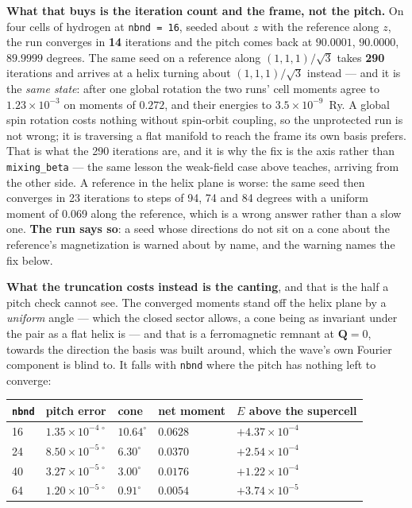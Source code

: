 \documentclass[11pt,a4paper]{article}
\newcommand{\code}[1]{\texttt{\small #1}}
\begin{document}
\textbf{What that buys is the iteration count and the frame, not the pitch.} On
four cells of hydrogen at \code{nbnd = 16}, seeded about $z$ with the reference
along $z$, the run converges in \textbf{14} iterations and the pitch comes back
at $90.0001$, $90.0000$, $89.9999$ degrees. The same seed on a reference along
$(1,1,1)/\sqrt3$ takes \textbf{290} iterations and arrives at a helix turning
about $(1,1,1)/\sqrt3$ instead --- and it is the \emph{same state}: after one
global rotation the two runs' cell moments agree to $1.23\times10^{-3}$ on
moments of $0.272$, and their energies to $3.5\times10^{-9}$~Ry. A global spin
rotation costs nothing without spin-orbit coupling, so the unprotected run is
not wrong; it is traversing a flat manifold to reach the frame its own basis
prefers. That is what the 290 iterations are, and it is why the fix is the axis
rather than \code{mixing\_beta} --- the same lesson the weak-field case above
teaches, arriving from the other side. A reference in the helix plane is
worse: the same seed then converges in 23 iterations to steps of 94, 74 and 84
degrees with a uniform moment of 0.069 along the reference, which is a wrong
answer rather than a slow one. \textbf{The run says so}: a seed whose
directions do not sit on a cone about the reference's magnetization is warned
about by name, and the warning names the fix below.

\textbf{What the truncation costs instead is the canting}, and that is the half a
pitch check cannot see. The converged moments stand off the helix plane by a
\emph{uniform} angle --- which the closed sector allows, a cone being as
invariant under the pair as a flat helix is --- and that is a ferromagnetic
remnant at $\mathbf Q = 0$, towards the direction the basis was built around,
which the wave's own Fourier component is blind to. It falls with \code{nbnd}
where the pitch has nothing left to converge:

\begin{center}
\begin{tabular}{lllll}
\code{nbnd} & pitch error & cone & net moment & $E$ above the supercell \\
\hline
16 & $1.35\times10^{-4\,\circ}$ & $10.64^\circ$ & $0.0628$ & $+4.37\times10^{-4}$ \\
24 & $8.50\times10^{-5\,\circ}$ & $6.30^\circ$ & $0.0370$ & $+2.54\times10^{-4}$ \\
40 & $3.27\times10^{-5\,\circ}$ & $3.00^\circ$ & $0.0176$ & $+1.22\times10^{-4}$ \\
64 & $1.20\times10^{-5\,\circ}$ & $0.91^\circ$ & $0.0054$ & $+3.74\times10^{-5}$ \\
\end{tabular}
\end{center}
\end{document}
